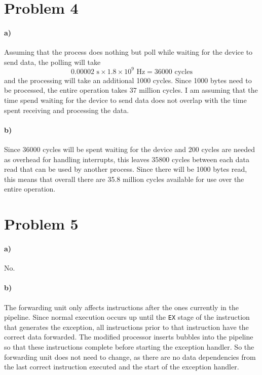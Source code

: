 \documentclass[12pt]{article}
\begin{document}
\section*{Problem 4}

\paragraph{a)}

Assuming that the process does nothing but poll while waiting for the device to send data, the polling will take
\[0.00002 \text{ s} \times 1.8 \times 10^9 \text{ Hz} = 36000 \text{ cycles}\]
and the processing will take an additional 1000 cycles. Since 1000 bytes need to be processed, the entire operation
takes 37 million cycles. I am assuming that the time spend waiting for the device to send data does not overlap with
the time spent receiving and processing the data.

\paragraph{b)}

Since 36000 cycles will be spent waiting for the device and 200 cycles are needed as overhead for handling interrupts,
this leaves 35800 cycles between each data read that can be used by another process. Since there will be 1000 bytes
read, this means that overall there are 35.8 million cycles available for use over the entire operation.

\section*{Problem 5}

\paragraph{a)}

No.

\paragraph{b)}

The forwarding unit only affects instructions after the ones currently in the pipeline. Since normal execution occurs up until
the \texttt{EX} stage of the instruction that generates the exception, all instructions prior to that instruction have the
correct data forwarded. The modified processor inserts bubbles into the pipeline so that these instructions complete before
starting the exception handler. So the forwarding unit does not need to change, as there are no data dependencies from the
last correct instruction executed and the start of the exception handler.
\end{document}
